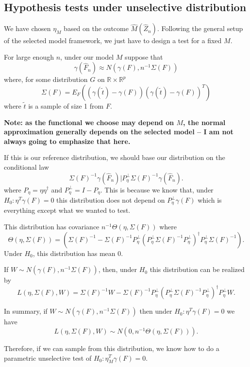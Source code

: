 \documentclass{article}
\newcommand{\real}{\mathbb{R}}
\begin{document}
\subsection{Hypothesis tests under unselective distribution}

We have chosen $\eta_M$ based on the outcome $\hat{M}(\hat{Z}_n)$. Following the general setup of the
selected model framework, we just have to design
a test for a fixed $M$.

For large enough $n$, under our model $M$ suppose that
$$
\gamma(\hat{F}_n) \approx N(\gamma(F), n^{-1} \Sigma(F))
$$
where, for some distribution $G$ on $\real \times \real^p$
$$
\Sigma(F) = E_{F}\left((\gamma(\tilde{t}) - \gamma(F))(\gamma(\tilde{t}) - \gamma(F))^T \right)
$$
where $\tilde{t}$ is a sample of size 1 from $F$.

{\bf Note: as the functional
we choose may depend on $M$, the normal approximation generally depends 
on the selected model -- I am not always going to emphasize that here.}

If this is our reference distribution, we should base our distribution on the 
conditional law 
$$\Sigma(F)^{-1}\gamma(\hat{F}_n) \big \vert P_{\eta}^{\perp}\Sigma(F)^{-1}\gamma(\hat{F}_n).$$ 
where $P_{\eta}=\eta\eta^{\dagger}$ and $P_{\eta}^{\perp} = I - P_{\eta}$.
This is because
we know that, under $H_0:\eta^T\gamma(F)=0$
this distribution does not depend on $P_{\eta}^{\perp}\gamma(F)$ which
is everything except what we wanted to test. 
 
This 
distribution has covariance $n^{-1} \Theta(\eta, \Sigma(F))$ where
$$
\Theta(\eta, \Sigma(F)) = \left(\Sigma(F)^{-1} - \Sigma(F)^{-1} P_{\eta}^{\perp} \left(P_{\eta}^{\perp} \Sigma(F)^{-1} P_{\eta}^{\perp} \right)^{\dagger}  P_{\eta}^{\perp} \Sigma(F)^{-1}  \right).
$$
Under $H_0$, this distribution has mean 0.

If $W \sim N(\gamma(F), n^{-1}\Sigma(F))$, then, under $H_0$
this distribution can be realized by 
$$
L(\eta, \Sigma(F), W) = \Sigma(F)^{-1} W - \Sigma(F)^{-1} P_{\eta}^{\perp} \left(P_{\eta}^{\perp} 
\Sigma(F)^{-1} P_{\eta}^{\perp} \right)^{\dagger}  P_{\eta}^{\perp} W.
$$

In summary, if $W \sim N(\gamma(F), n^{-1}\Sigma(F))$ 
then under $H_0: \eta^T\gamma(F)=0$ we have
$$
L(\eta, \Sigma(F), W) \sim N(0, n^{-1} \Theta(\eta, \Sigma(F))).
$$


Therefore, if we can
sample from this distribution, we know how to
do a parametric unselective test of $H_0:\eta_M^T\gamma(F)=0$.
\end{document}
